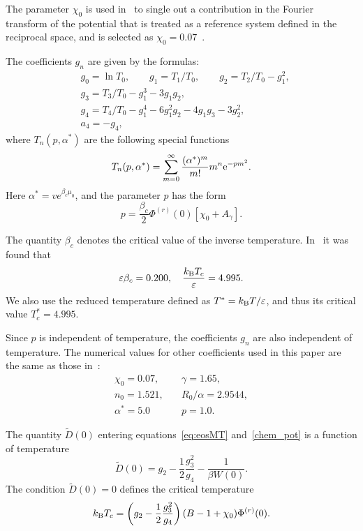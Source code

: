 The parameter $\chi_0$ is used in~\cite{KozlovskiiDobush2020} to single out a contribution in the Fourier transform of the potential that is treated as a reference system defined in the reciprocal space, and is selected as $\chi_0 = 0.07$~\cite{KozlovskiiDobush2020}.

The coefficients $g_n$ are given by the formulas:
\begin{align}
	& g_0 = \ln T_0, \qquad g_1 = T_1/T_0, \qquad g_2 = T_2/T_0 - g_1^2,  
	\nonumber \\
	& g_3 = T_3/T_0 - g_1^3 - 3g_1 g_2, 
	\nonumber\\
	& g_4 = T_4/T_0 - g_1^4 - 6 g_1^2 g_2 - 4 g_1 g_3 - 3 g_2^2, 
	\nonumber\\
	& a_4 = -g_4,
\end{align}
where $T_n(p,\alpha^*)$ are the following special functions
\begin{equation}
	T_n(p,\alpha^*) = \sum_{m=0}^{\infty} \frac{(\alpha^*)^m}{m!} m^n {\rm e}^{-pm^2}.
\end{equation}
Here $\alpha^*=v e^{\beta_c\mu_0}$, and the parameter $p$ has the form
\begin{equation}
	p = \frac{\beta_c}{2} \Phi^{(r)}(0) [\chi_0 + A_\gamma].
\end{equation} 

The quantity $\beta_c$ denotes the critical value of the inverse temperature. In~\cite{KozlovskiiDobush2020} it was found that
\begin{equation*}
	\varepsilon\beta_c = 0.200, \quad \frac{k_{\rm B} T_c}{\varepsilon} = 4.995.
\end{equation*}
We also use the reduced temperature defined as $T^* = k_{\rm B}T/\varepsilon$, and thus its critical value $T^*_c = 4.995.$

Since $p$ is independent of temperature, the coefficients $g_n$ are also independent of temperature. The numerical values for other coefficients used in this paper are the same as those in~\cite[eqs.~(5), (23), and~(24)]{KozlovskiiDobush2020}:
\begin{eqnarray}
	\label{params}
	\chi_0 = 0.07, & \quad \gamma = 1.65, \nonumber\\
	n_0 = 1.521, & \quad R_0/\alpha = 2.9544, \nonumber\\
	\alpha^* = 5.0 & \quad p = 1.0.
\end{eqnarray}

The quantity $\tilde D(0)$ entering equations~\eqref{eq:eosMT} and~\eqref{chem_pot} is a function of temperature
\begin{equation}
	\label{def:D0}
	\tilde D(0) = g_2 - \frac{1}{2} \frac{g_3^2}{g_4} - \frac{1}{\beta W(0)}.
\end{equation}
The condition $\tilde{D}(0) = 0$ defines the critical temperature~\cite{KozlovskiiDobush2020}
\begin{equation}
	k_{\rm B}T_c = \left(g_2 - \frac{1}{2} \frac{g_3^2}{g_4} \right) (B - 1 + \chi_0) \Phi^{(r)}(0).
\end{equation}  

